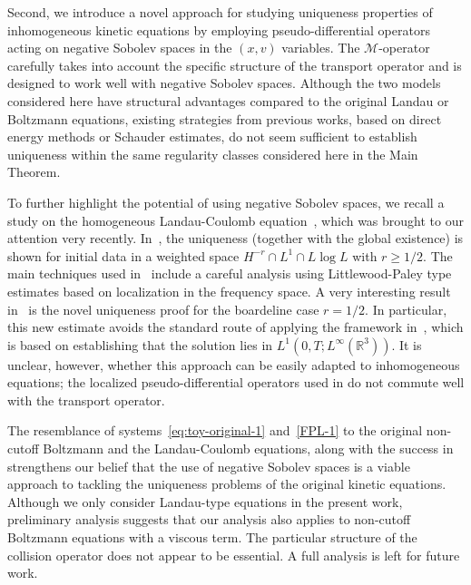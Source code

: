 \documentclass[11pt,american, reqno]{amsart}
\numberwithin{equation}{section}
\newcommand{\R}{\mathbb R}
\newcommand{\1}{\mathds{1}}
\newcommand{\CalM}{\mathcal{M}}
\numberwithin{equation}{section}
\begin{document}
Second, we introduce a novel approach for studying uniqueness properties of inhomogeneous kinetic equations by employing pseudo-differential operators acting on negative Sobolev spaces in the $(x, v)$ variables. The $\CalM$-operator carefully takes into account the specific structure of the transport operator and is designed to work well with negative Sobolev spaces. Although the two models considered here have structural advantages compared to the original Landau or Boltzmann equations, existing strategies from previous works, based on direct energy methods or Schauder estimates, do not seem sufficient to establish uniqueness within the same regularity classes considered here in the Main Theorem. 

To further highlight the potential of using negative Sobolev spaces, we recall a study on the homogeneous Landau-Coulomb equation~\cite{HJJ2025}, which was brought to our attention very recently. In~\cite{HJJ2025}, the uniqueness (together with the global existence) is shown for initial data in a weighted space $H^{-r} \cap L^1 \cap L\log L$ with $r \geq 1/2$. The main techniques used in~\cite{HJJ2025} include a careful analysis using Littlewood-Paley type estimates based on localization in the frequency space. A very interesting result in~\cite{HJJ2025} is the novel uniqueness proof for the boardeline case $r=1/2$.  In particular, this new estimate avoids the standard route of applying the framework in~\cite{Fournier10}, which is based on establishing that the solution lies in $L^1(0, T; L^\infty(\R^3))$. It is unclear, however, whether this approach can be easily adapted to inhomogeneous equations; the localized pseudo-differential operators used in \cite{HJJ2025} do not commute well with the transport operator.


The resemblance of systems~\eqref{eq:toy-original-1} and~\eqref{FPL-1} to the original non-cutoff Boltzmann and the Landau-Coulomb equations, along with the success in~\cite{HJJ2025} strengthens our belief that the use of negative Sobolev spaces is a viable approach to tackling the uniqueness problems of the original kinetic equations. Although we only consider Landau-type equations in the present work, preliminary analysis suggests that our analysis also  applies to non-cutoff  Boltzmann equations with a viscous term. The particular structure of the collision operator does not appear to be essential. A full analysis is left for future work.  
\end{document}
